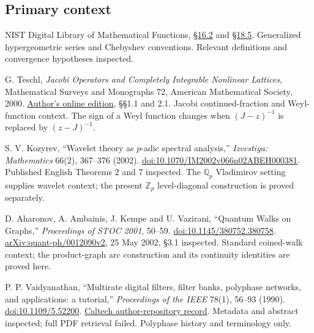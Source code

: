 \subsection*{Primary context}
\begin{enumerate}[label={[C\arabic*]},leftmargin=2.5em]
\item NIST Digital Library of Mathematical Functions,
\href{https://dlmf.nist.gov/16.2}{\S16.2} and
\href{https://dlmf.nist.gov/18.5}{\S18.5}.
Generalized hypergeometric series and Chebyshev conventions.
Relevant definitions and convergence hypotheses inspected.

\item G. Teschl,
\emph{Jacobi Operators and Completely Integrable Nonlinear Lattices},
Mathematical Surveys and Monographs 72, American Mathematical Society, 2000.
\href{https://www.mat.univie.ac.at/~gerald/ftp/book-jac/jacop.pdf}{Author's online edition},
\S\S1.1 and 2.1.
Jacobi continued-fraction and Weyl-function context.
The sign of a Weyl function changes when $(J-z)^{-1}$ is replaced by $(z-J)^{-1}$.

\item S. V. Kozyrev,
``Wavelet theory as $p$-adic spectral analysis,''
\emph{Izvestiya: Mathematics} 66(2), 367--376 (2002).
\href{https://doi.org/10.1070/IM2002v066n02ABEH000381}{doi:10.1070/IM2002v066n02ABEH000381}.
Published English Theorems 2 and 7 inspected.
The $\mathbb Q_p$ Vladimirov setting supplies wavelet context;
the present $\mathbb Z_p$ level-diagonal construction is proved separately.

\item D. Aharonov, A. Ambainis, J. Kempe and U. Vazirani,
``Quantum Walks on Graphs,''
\emph{Proceedings of STOC 2001}, 50--59.
\href{https://doi.org/10.1145/380752.380758}{doi:10.1145/380752.380758}.
\href{https://arxiv.org/abs/quant-ph/0012090v2}{arXiv:quant-ph/0012090v2},
25 May 2002, \S3.1 inspected.
Standard coined-walk context; the product-graph arc construction and its continuity identities are proved here.

\item P. P. Vaidyanathan,
``Multirate digital filters, filter banks, polyphase networks, and applications: a tutorial,''
\emph{Proceedings of the IEEE} 78(1), 56--93 (1990).
\href{https://doi.org/10.1109/5.52200}{doi:10.1109/5.52200}.
\href{https://authors.library.caltech.edu/records/x720m-mr760}{Caltech author-repository record}.
Metadata and abstract inspected; full PDF retrieval failed.
Polyphase history and terminology only.
\end{enumerate}


